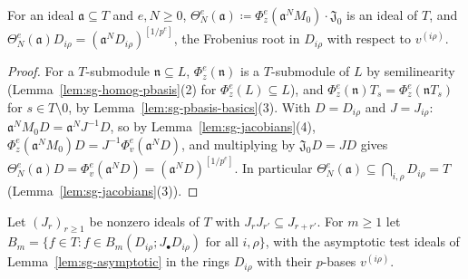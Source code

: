 \begin{lemma}\label{lem:sg-theta-local}
\leanok
{}
For an ideal $\mathfrak a\subseteq T$ and $e,N\ge0$, $\Theta^e_N(\mathfrak a)\coloneqq\Phi^e_z(\mathfrak a^NM_0)\cdot\mathfrak J_0$ is an ideal of $T$, and
$\Theta^e_N(\mathfrak a)D_{i\rho}=(\mathfrak a^ND_{i\rho})^{[1/p^e]}$, the Frobenius root in $D_{i\rho}$ with respect to $v^{(i\rho)}$.
\end{lemma}

\begin{proof}
For a $T$-submodule $\mathfrak n\subseteq L$, $\Phi^e_z(\mathfrak n)$ is a $T$-submodule of $L$ by semilinearity (Lemma~\ref{lem:sg-homog-pbasis}(2) for
$\Phi^e_z(L)\subseteq L$), and $\Phi^e_z(\mathfrak n)T_s=\Phi^e_z(\mathfrak nT_s)$ for $s\in T\setminus0$, by Lemma~\ref{lem:sg-pbasis-basics}(3). With $D=D_{i\rho}$ and
$J=J_{i\rho}$: $\mathfrak a^NM_0D=\mathfrak a^NJ^{-1}D$, so by Lemma~\ref{lem:sg-jacobians}(4), $\Phi^e_z(\mathfrak a^NM_0)D=J^{-1}\Phi^e_v(\mathfrak a^ND)$, and multiplying by
$\mathfrak J_0D=JD$ gives $\Theta^e_N(\mathfrak a)D=\Phi^e_v(\mathfrak a^ND)=(\mathfrak a^ND)^{[1/p^e]}$. In particular $\Theta^e_N(\mathfrak a)\subseteq\bigcap_{i,\rho}D_{i\rho}=T$
(Lemma~\ref{lem:sg-jacobians}(3)).
\end{proof}

\begin{definition}\label{def:sg-test-X}
\leanok
{}
Let $(J_r)_{r\ge1}$ be nonzero ideals of $T$ with $J_rJ_{r'}\subseteq J_{r+r'}$. For $m\ge1$ let
$B_m=\{f\in T:f\in B_m(D_{i\rho};J_\bullet D_{i\rho})\text{ for all }i,\rho\}$, with the asymptotic test ideals of Lemma~\ref{lem:sg-asymptotic} in the
rings $D_{i\rho}$ with their $p$-bases $v^{(i\rho)}$.
\end{definition}

